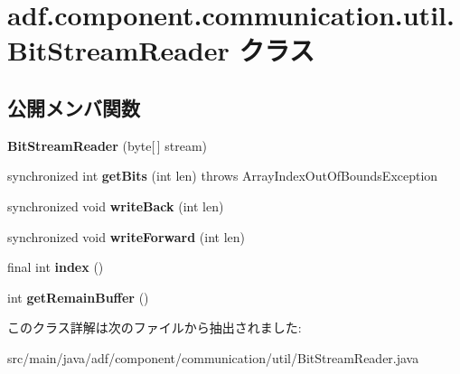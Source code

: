 \hypertarget{classadf_1_1component_1_1communication_1_1util_1_1BitStreamReader}{}\section{adf.\+component.\+communication.\+util.\+Bit\+Stream\+Reader クラス}
\label{classadf_1_1component_1_1communication_1_1util_1_1BitStreamReader}
\subsection*{公開メンバ関数}
\begin{DoxyCompactItemize}
\item 
\hypertarget{classadf_1_1component_1_1communication_1_1util_1_1BitStreamReader_aa675e7b62cbb86353d35e4501ce747a0}{}\label{classadf_1_1component_1_1communication_1_1util_1_1BitStreamReader_aa675e7b62cbb86353d35e4501ce747a0} 
{\bfseries Bit\+Stream\+Reader} (byte\mbox{[}$\,$\mbox{]} stream)
\item 
\hypertarget{classadf_1_1component_1_1communication_1_1util_1_1BitStreamReader_a35fa945440eb8d7020c719e1505b9e8d}{}\label{classadf_1_1component_1_1communication_1_1util_1_1BitStreamReader_a35fa945440eb8d7020c719e1505b9e8d} 
synchronized int {\bfseries get\+Bits} (int len)  throws Array\+Index\+Out\+Of\+Bounds\+Exception 
\item 
\hypertarget{classadf_1_1component_1_1communication_1_1util_1_1BitStreamReader_a86348d3f5ae3521b1b926d08b1ce4999}{}\label{classadf_1_1component_1_1communication_1_1util_1_1BitStreamReader_a86348d3f5ae3521b1b926d08b1ce4999} 
synchronized void {\bfseries write\+Back} (int len)
\item 
\hypertarget{classadf_1_1component_1_1communication_1_1util_1_1BitStreamReader_a9900873881f74452fd57a0ced23358de}{}\label{classadf_1_1component_1_1communication_1_1util_1_1BitStreamReader_a9900873881f74452fd57a0ced23358de} 
synchronized void {\bfseries write\+Forward} (int len)
\item 
\hypertarget{classadf_1_1component_1_1communication_1_1util_1_1BitStreamReader_ac2591f38dbbd31feeea3fbfcce95478b}{}\label{classadf_1_1component_1_1communication_1_1util_1_1BitStreamReader_ac2591f38dbbd31feeea3fbfcce95478b} 
final int {\bfseries index} ()
\item 
\hypertarget{classadf_1_1component_1_1communication_1_1util_1_1BitStreamReader_aac24549335f0248ac12dd8861e5dd426}{}\label{classadf_1_1component_1_1communication_1_1util_1_1BitStreamReader_aac24549335f0248ac12dd8861e5dd426} 
int {\bfseries get\+Remain\+Buffer} ()
\end{DoxyCompactItemize}


このクラス詳解は次のファイルから抽出されました\+:\begin{DoxyCompactItemize}
\item 
src/main/java/adf/component/communication/util/Bit\+Stream\+Reader.\+java\end{DoxyCompactItemize}
